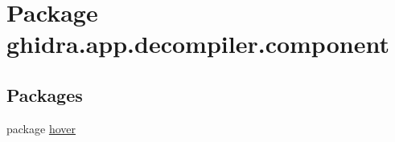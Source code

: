 \hypertarget{namespaceghidra_1_1app_1_1decompiler_1_1component}{}\section{Package ghidra.\+app.\+decompiler.\+component}
\label{namespaceghidra_1_1app_1_1decompiler_1_1component}
\subsection*{Packages}
\begin{DoxyCompactItemize}
\item 
package \mbox{\hyperlink{namespaceghidra_1_1app_1_1decompiler_1_1component_1_1hover}{hover}}
\end{DoxyCompactItemize}
